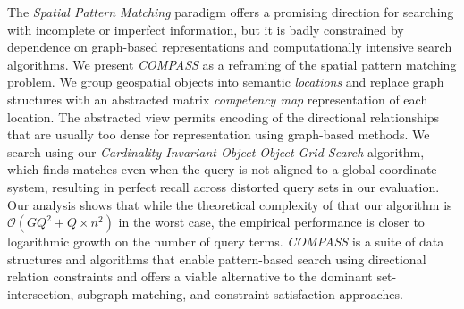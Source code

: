 
The \textit{Spatial Pattern Matching} paradigm offers a promising direction for searching with incomplete or imperfect information, but it is badly constrained by dependence on graph-based representations and computationally intensive search algorithms. 
We present \emph{COMPASS} as a reframing of the spatial pattern matching problem. 
We group geospatial objects into semantic \textit{locations} and replace graph structures with an abstracted matrix \textit{competency map} representation of each location. 
The abstracted view permits encoding of the directional relationships that are usually too dense for representation using graph-based methods. We search using our \textit{Cardinality Invariant Object-Object Grid Search} algorithm, which finds matches even when the query is not aligned to a global coordinate system, resulting in perfect recall across distorted query sets in our evaluation. 
Our analysis shows that while the theoretical complexity of that our algorithm is $\mathcal{O}(GQ^2 + Q\times n^2)$ 
in the worst case, the empirical performance is closer to logarithmic growth on the number of query terms.
\emph{COMPASS} is a suite of data structures and algorithms that enable pattern-based search using directional relation constraints and offers a viable alternative to the dominant set-intersection, subgraph matching, and constraint satisfaction approaches.




